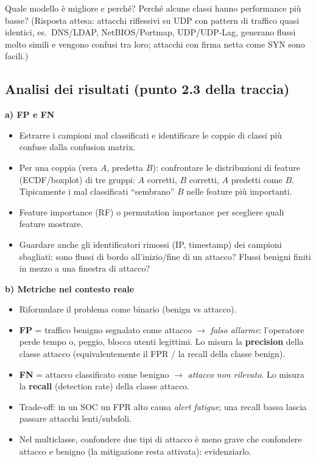 \begin{domande}
Quale modello è migliore e perché? Perché alcune classi hanno performance più
basse? (Risposta attesa: attacchi riflessivi su UDP con pattern di traffico
quasi identici, es.\ DNS/LDAP, NetBIOS/Portmap, UDP/UDP-Lag, generano
flussi molto simili e vengono confusi tra loro; attacchi con firma netta come
SYN sono facili.)
\end{domande}

\subsection{Analisi dei risultati (punto 2.3 della traccia)}
\begin{strategia}
\textbf{a) FP e FN}
\begin{itemize}
  \item Estrarre i campioni mal classificati e identificare le coppie di
        classi più confuse dalla confusion matrix.
  \item Per una coppia (vera $A$, predetta $B$): confrontare le distribuzioni
        di feature (ECDF/boxplot) di tre gruppi: $A$ corretti, $B$ corretti,
        $A$ predetti come $B$. Tipicamente i mal classificati ``sembrano''
        $B$ nelle feature più importanti.
  \item Feature importance (RF) o permutation importance per scegliere quali
        feature mostrare.
  \item Guardare anche gli identificatori rimossi (IP, timestamp) dei campioni
        sbagliati: sono flussi di bordo all'inizio/fine di un attacco? Flussi
        benigni finiti in mezzo a una finestra di attacco?
\end{itemize}

\textbf{b) Metriche nel contesto reale}
\begin{itemize}
  \item Riformulare il problema come binario (benign vs attacco).
  \item \textbf{FP} = traffico benigno segnalato come attacco $\rightarrow$
        \emph{falso allarme}: l'operatore perde tempo o, peggio, blocca utenti
        legittimi. Lo misura la \textbf{precision} della classe attacco
        (equivalentemente il FPR / la recall della classe benign).
  \item \textbf{FN} = attacco classificato come benigno $\rightarrow$
        \emph{attacco non rilevato}. Lo misura la \textbf{recall} (detection
        rate) della classe attacco.
  \item Trade-off: in un SOC un FPR alto causa \emph{alert fatigue}; una
        recall bassa lascia passare attacchi lenti/subdoli.
  \item Nel multiclasse, confondere due tipi di attacco è meno grave che
        confondere attacco e benigno (la mitigazione resta attivata):
        evidenziarlo.
\end{itemize}


\end{strategia}
